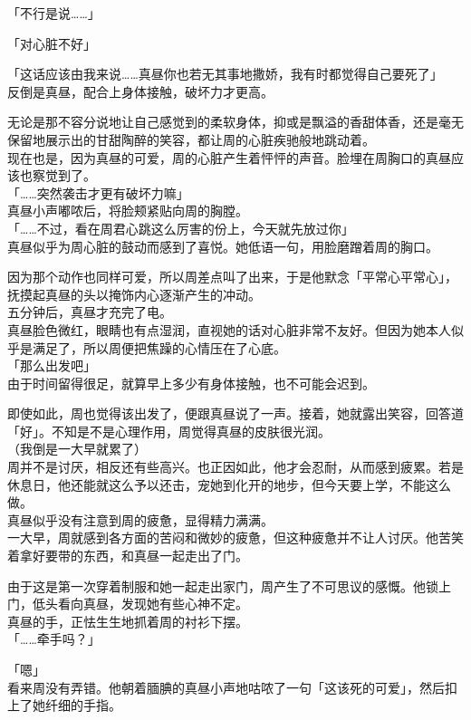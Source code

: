 「不行是说……」

「对心脏不好」

「这话应该由我来说……真昼你也若无其事地撒娇，我有时都觉得自己要死了」\\

反倒是真昼，配合上身体接触，破坏力才更高。

无论是那不容分说地让自己感觉到的柔软身体，抑或是飘溢的香甜体香，还是毫无保留地展示出的甘甜陶醉的笑容，都让周的心脏疾驰般地跳动着。\\

现在也是，因为真昼的可爱，周的心脏产生着怦怦的声音。脸埋在周胸口的真昼应该也察觉到了。\\

「……突然袭击才更有破坏力嘛」\\

真昼小声嘟哝后，将脸颊紧贴向周的胸膛。\\

「……不过，看在周君心跳这么厉害的份上，今天就先放过你」\\

真昼似乎为周心脏的鼓动而感到了喜悦。她低语一句，用脸磨蹭着周的胸口。

因为那个动作也同样可爱，所以周差点叫了出来，于是他默念「平常心平常心」，抚摸起真昼的头以掩饰内心逐渐产生的冲动。\\

五分钟后，真昼才充完了电。\\

真昼脸色微红，眼睛也有点湿润，直视她的话对心脏非常不友好。但因为她本人似乎是满足了，所以周便把焦躁的心情压在了心底。\\

「那么出发吧」\\

由于时间留得很足，就算早上多少有身体接触，也不可能会迟到。

即使如此，周也觉得该出发了，便跟真昼说了一声。接着，她就露出笑容，回答道「好」。不知是不是心理作用，周觉得真昼的皮肤很光润。\\

（我倒是一大早就累了）\\

周并不是讨厌，相反还有些高兴。也正因如此，他才会忍耐，从而感到疲累。若是休息日，他还能就这么予以还击，宠她到化开的地步，但今天要上学，不能这么做。\\

真昼似乎没有注意到周的疲惫，显得精力满满。\\

一大早，周就感到各方面的苦闷和微妙的疲惫，但这种疲惫并不让人讨厌。他苦笑着拿好要带的东西，和真昼一起走出了门。

由于这是第一次穿着制服和她一起走出家门，周产生了不可思议的感慨。他锁上门，低头看向真昼，发现她有些心神不定。\\

真昼的手，正怯生生地抓着周的衬衫下摆。\\

「……牵手吗？」

「嗯」\\

看来周没有弄错。他朝着腼腆的真昼小声地咕哝了一句「这该死的可爱」，然后扣上了她纤细的手指。
